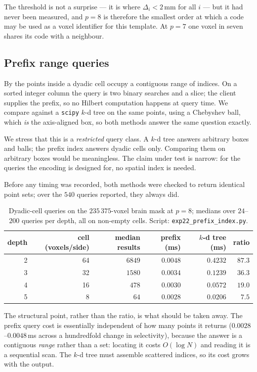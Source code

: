 \documentclass[11pt,a4paper]{article}
\theoremstyle{plain}
\theoremstyle{definition}
\theoremstyle{remark}
\begin{document}
The threshold is not a surprise --- it is where $\Delta_i<2$\,mm for all
$i$ --- but it had never been measured, and $p=8$ is therefore the smallest
order at which a code may be used as a voxel identifier for this template.
At $p=7$ one voxel in seven shares its code with a neighbour.

\subsection{Prefix range queries}\label{sec:bench}

By  the points inside a dyadic cell occupy a contiguous
range of indices. On a sorted integer column the query is two binary
searches and a slice; the client supplies the prefix, so no Hilbert
computation happens at query time. We compare against a \texttt{scipy}
$k$-d tree on the same points, using a Chebyshev ball, which \emph{is} the
axis-aligned box, so both methods answer the same question exactly.

We stress that this is a \emph{restricted} query class. A $k$-d tree
answers arbitrary boxes and balls; the prefix index answers dyadic cells
only. Comparing them on arbitrary boxes would be meaningless. The claim
under test is narrow: for the queries the encoding is designed for, no
spatial index is needed.

Before any timing was recorded, both methods were checked to return
identical point sets; over the $540$ queries reported, they always did.

\begin{table}[h]
\centering
\begin{tabular}{rrrrrr}
\toprule
depth & cell (voxels/side) & median results & prefix (ms) & $k$-d tree (ms) & ratio\\
\midrule
2 & 64 & $6849$ & $0.0048$ & $0.4232$ & $87.3$\\
3 & 32 & $1580$ & $0.0034$ & $0.1239$ & $36.3$\\
4 & 16 & $478$  & $0.0030$ & $0.0572$ & $19.0$\\
5 & 8  & $64$   & $0.0028$ & $0.0206$ & $7.5$\\
\bottomrule
\end{tabular}
\caption{Dyadic-cell queries on the $235\,375$-voxel brain mask at $p=8$;
medians over $24$--$200$ queries per depth, all on non-empty cells.
Script: \texttt{exp22\_prefix\_index.py}.}
\label{tab:bench}
\end{table}

The structural point, rather than the ratio, is what should be taken away.
The prefix query cost is essentially independent of how many points it
returns ($0.0028$--$0.0048$\,ms across a hundredfold change in
selectivity), because the answer is a contiguous \emph{range} rather than a
set: locating it costs $O(\log N)$ and reading it is a sequential scan. The
$k$-d tree must assemble scattered indices, so its cost grows with the
output.
\end{document}
